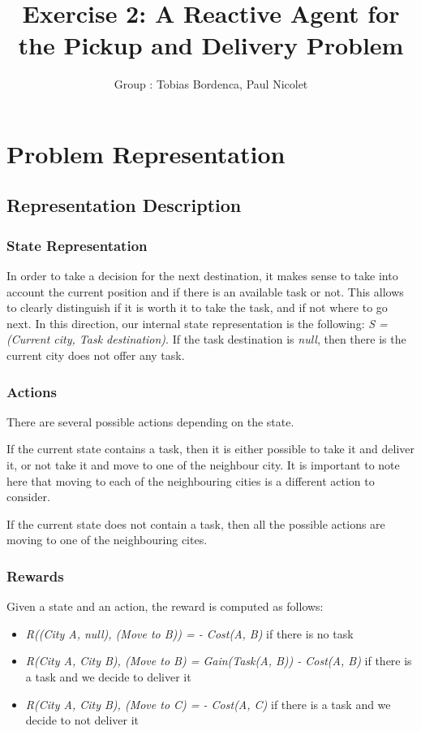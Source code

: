 \documentclass[11pt]{article}
\title{\bf Exercise 2: A Reactive Agent for the Pickup and Delivery Problem}
\author{Group \textnumero1: Tobias Bordenca, Paul Nicolet}
\begin{document}
\maketitle

\section{Problem Representation}

\subsection{Representation Description}
\subsubsection{State Representation}
In order to take a decision for the next destination, it makes sense to take into account the current position and if there is an available task or not. This allows to clearly distinguish if it is worth it to take the task, and if not where to go next. In this direction, our internal state representation is the following: \textit{S = (Current city, Task destination)}. If the task destination is \textit{null}, then there is the current city does not offer any task.

\subsubsection{Actions}
There are several possible actions depending on the state. 

If the current state contains a task, then it is either possible to take it and deliver it, or not take it and move to one of the neighbour city. It is important to note here that moving to each of the neighbouring cities is a different action to consider.

If the current state does not contain a task, then all the possible actions are moving to one of the neighbouring cites.

\subsubsection{Rewards}
Given a state and an action, the reward is computed as follows:
\begin{itemize}
	\item \textit{R((City A, null), (Move to B)) = - Cost(A, B)} if there is no task
	\item \textit{R(City A, City B), (Move to B) = Gain(Task(A, B)) - Cost(A, B)} if there is a task and we decide to deliver it
	\item \textit{R(City A, City B), (Move to C) =  - Cost(A, C)} if there is a task and we decide to not deliver it
\end{itemize}
\end{document}
